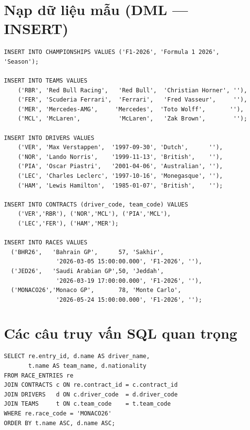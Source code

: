 \documentclass[13pt, a4paper]{report}
\begin{document}
\section{Nạp dữ liệu mẫu (DML --- INSERT)}

\begin{lstlisting}[caption={INSERT --- Dữ liệu mẫu mùa giải F1 2026}]
INSERT INTO CHAMPIONSHIPS VALUES ('F1-2026', 'Formula 1 2026', 'Season');

INSERT INTO TEAMS VALUES
    ('RBR', 'Red Bull Racing',   'Red Bull',  'Christian Horner', ''),
    ('FER', 'Scuderia Ferrari',  'Ferrari',   'Fred Vasseur',     ''),
    ('MER', 'Mercedes-AMG',     'Mercedes',  'Toto Wolff',       ''),
    ('MCL', 'McLaren',           'McLaren',   'Zak Brown',        '');

INSERT INTO DRIVERS VALUES
    ('VER', 'Max Verstappen',  '1997-09-30', 'Dutch',      ''),
    ('NOR', 'Lando Norris',    '1999-11-13', 'British',    ''),
    ('PIA', 'Oscar Piastri',   '2001-04-06', 'Australian', ''),
    ('LEC', 'Charles Leclerc', '1997-10-16', 'Monegasque', ''),
    ('HAM', 'Lewis Hamilton',  '1985-01-07', 'British',    '');

INSERT INTO CONTRACTS (driver_code, team_code) VALUES
    ('VER','RBR'), ('NOR','MCL'), ('PIA','MCL'),
    ('LEC','FER'), ('HAM','MER');

INSERT INTO RACES VALUES
  ('BHR26',   'Bahrain GP',      57, 'Sakhir',
               '2026-03-05 15:00:00.000', 'F1-2026', ''),
  ('JED26',   'Saudi Arabian GP',50, 'Jeddah',
               '2026-03-19 17:00:00.000', 'F1-2026', ''),
  ('MONACO26','Monaco GP',       78, 'Monte Carlo',
               '2026-05-24 15:00:00.000', 'F1-2026', '');
\end{lstlisting}

\section{Các câu truy vấn SQL quan trọng}

\begin{lstlisting}[caption={SELECT với JOIN --- Lấy danh sách đăng ký một chặng}]
SELECT re.entry_id, d.name AS driver_name,
       t.name AS team_name, d.nationality
FROM RACE_ENTRIES re
JOIN CONTRACTS c ON re.contract_id = c.contract_id
JOIN DRIVERS   d ON c.driver_code  = d.driver_code
JOIN TEAMS     t ON c.team_code    = t.team_code
WHERE re.race_code = 'MONACO26'
ORDER BY t.name ASC, d.name ASC;
\end{lstlisting}
\end{document}
